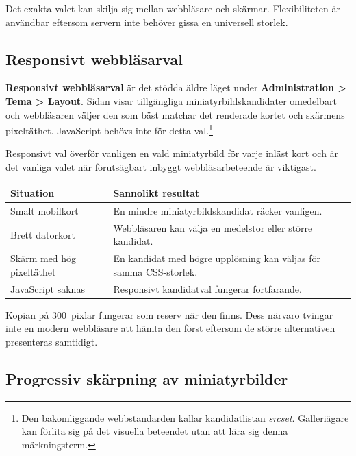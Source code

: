 \documentclass[11pt,a4paper]{article}
\newcommand{\ui}[1]{\textbf{#1}}
\begin{document}
Det exakta valet kan skilja sig mellan webbläsare och skärmar. Flexibiliteten är
användbar eftersom servern inte behöver gissa en universell storlek.

\subsection{Responsivt webbläsarval}

\ui{Responsivt webbläsarval} är det stödda äldre läget under
\ui{Administration > Tema > Layout}. Sidan visar tillgängliga
miniatyrbildskandidater omedelbart och webbläsaren väljer den som bäst matchar
det renderade kortet och skärmens pixeltäthet. JavaScript behövs inte för detta
val.\footnote{Den bakomliggande webbstandarden kallar kandidatlistan
\emph{srcset}. Galleriägare kan förlita sig på det visuella beteendet utan att
lära sig denna märkningsterm.}

Responsivt val överför vanligen en vald miniatyrbild för varje inläst kort och
är det vanliga valet när förutsägbart inbyggt webbläsarbeteende är viktigast.

\begin{tabularx}{\textwidth}{>{\RaggedRight\arraybackslash}p{} X}
\toprule
\textbf{Situation} & \textbf{Sannolikt resultat}\\
\midrule
Smalt mobilkort & En mindre miniatyrbildskandidat räcker vanligen.\\
Brett datorkort & Webbläsaren kan välja en medelstor eller större kandidat.\\
Skärm med hög pixeltäthet & En kandidat med högre upplösning kan väljas för
samma CSS-storlek.\\
JavaScript saknas & Responsivt kandidatval fungerar fortfarande.\\
\bottomrule
\end{tabularx}

Kopian på 300~pixlar fungerar som reserv när den finns. Dess närvaro tvingar
inte en modern webbläsare att hämta den först eftersom de större alternativen
presenteras samtidigt.

\subsection{Progressiv skärpning av miniatyrbilder}
\end{document}
